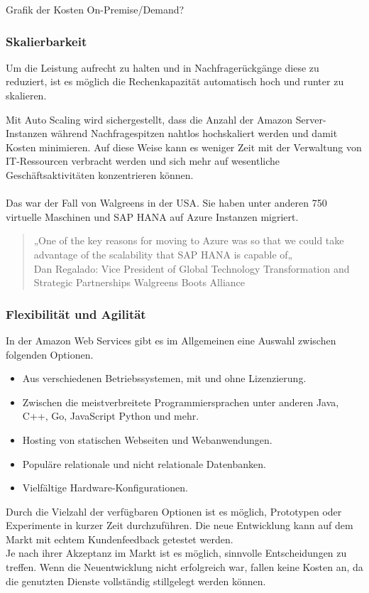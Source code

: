 Grafik der Kosten On-Premise/Demand?

\subsubsection{Skalierbarkeit}
Um die Leistung aufrecht zu halten und in Nachfragerückgänge diese zu reduziert,  ist es möglich die Rechenkapazität  automatisch hoch und runter zu skalieren.

Mit Auto Scaling wird sichergestellt, dass die Anzahl der Amazon Server-Instanzen während
Nachfragespitzen nahtlos hochskaliert werden und damit Kosten minimieren.
Auf diese Weise kann es weniger Zeit mit der Verwaltung von IT-Ressourcen verbracht werden und sich mehr auf wesentliche Geschäftsaktivitäten konzentrieren können.
\\\\
Das war der Fall von Walgreens in der USA.
Sie haben unter anderen 750 virtuelle Maschinen und SAP HANA auf Azure Instanzen migriert.

\begin{quote}
      „One of the key reasons for moving to Azure was so that we could take advantage of the scalability that SAP HANA is capable of„
      \\
      Dan Regalado: Vice President of Global Technology Transformation and Strategic Partnerships Walgreens Boots Alliance
            {\cite{AZU01}}
\end{quote}

\subsubsection{Flexibilität und Agilität}
In der Amazon Web Services gibt es im Allgemeinen eine Auswahl zwischen folgenden Optionen.
\begin{itemize}
      \item
            Aus verschiedenen Betriebssystemen, mit und ohne Lizenzierung.
      \item
            Zwischen die meistverbreitete Programmiersprachen unter anderen Java, C++, Go, JavaScript Python und mehr.
      \item
            Hosting von statischen Webseiten und Webanwendungen.
      \item
            Populäre relationale und nicht relationale Datenbanken.
      \item
            Vielfältige Hardware-Konfigurationen.
            
\end{itemize}
\begin{flushleft}
      Durch die Vielzahl der verfügbaren Optionen ist es möglich, Prototypen oder Experimente in kurzer Zeit durchzuführen.
      Die neue Entwicklung kann auf dem Markt mit echtem Kundenfeedback getestet werden.
\\
      Je nach ihrer Akzeptanz im Markt ist es möglich, sinnvolle Entscheidungen zu treffen.
      Wenn die Neuentwicklung nicht erfolgreich war, fallen keine Kosten an, da die genutzten Dienste vollständig stillgelegt werden können.
\end{flushleft}
{\cite{AMZ03, AMZ04}}

